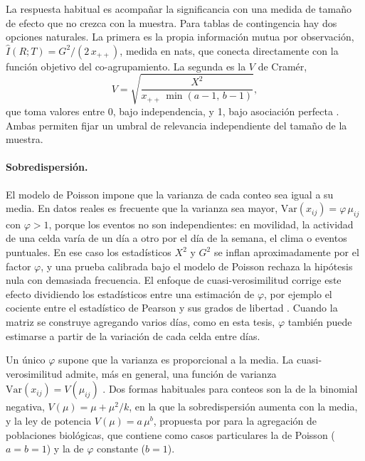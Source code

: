 La respuesta habitual es acompañar la significancia con una medida de tamaño de
efecto que no crezca con la muestra. Para tablas de contingencia hay dos opciones
naturales. La primera es la propia información mutua por observación,
$\hat I(R;T) = G^2/(2\,x_{++})$, medida en nats, que conecta directamente con la
función objetivo del co-agrupamiento. La segunda es la $V$ de Cramér,
\begin{equation}\label{eq:cramer}
  V = \sqrt{\frac{X^2}{x_{++}\,\min(a-1,\, b-1)}} ,
\end{equation}
que toma valores entre 0, bajo independencia, y 1, bajo asociación perfecta
\cite{Agresti2013}. Ambas permiten fijar un umbral de relevancia independiente
del tamaño de la muestra.

\paragraph{Sobredispersión.} El modelo de Poisson impone que la varianza de cada
conteo sea igual a su media. En datos reales es frecuente que la varianza sea
mayor, $\mathrm{Var}(x_{ij}) = \varphi\,\mu_{ij}$ con $\varphi > 1$, porque los
eventos no son independientes: en movilidad, la actividad de una celda varía de un
día a otro por el día de la semana, el clima o eventos puntuales. En ese caso los
estadísticos $X^2$ y $G^2$ se inflan aproximadamente por el factor $\varphi$, y
una prueba calibrada bajo el modelo de Poisson rechaza la hipótesis nula con
demasiada frecuencia. El enfoque de cuasi-verosimilitud corrige este efecto
dividiendo los estadísticos entre una estimación de $\varphi$, por ejemplo el
cociente entre el estadístico de Pearson y sus grados de libertad
\cite{McCullagh1989}. Cuando la matriz se construye agregando varios días, como en
esta tesis, $\varphi$ también puede estimarse a partir de la variación de cada
celda entre días.

Un único $\varphi$ supone que la varianza es proporcional a la media. La
cuasi-verosimilitud admite, más en general, una función de varianza
$\mathrm{Var}(x_{ij}) = V(\mu_{ij})$ \cite{McCullagh1989}. Dos formas habituales
para conteos son la de la binomial negativa, $V(\mu) = \mu + \mu^2/k$, en la que
la sobredispersión aumenta con la media, y la ley de potencia
$V(\mu) = a\,\mu^b$, propuesta por \cite{Taylor1961} para la agregación de
poblaciones biológicas, que contiene como casos particulares la de Poisson
($a=b=1$) y la de $\varphi$ constante ($b=1$).

